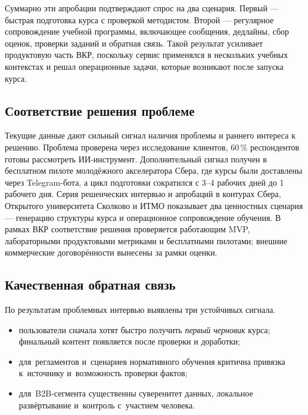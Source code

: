 Суммарно эти апробации подтверждают спрос на два сценария. Первый —
быстрая подготовка курса с проверкой методистом. Второй — регулярное
сопровождение учебной программы, включающее сообщения, дедлайны, сбор оценок,
проверки заданий и обратная связь. Такой результат усиливает продуктовую
часть ВКР, поскольку сервис применялся в нескольких учебных контекстах и решал
операционные задачи, которые возникают после запуска курса.

\subsection{Соответствие решения проблеме}

Текущие данные дают сильный сигнал наличия проблемы и раннего интереса
к решению. Проблема проверена через исследование клиентов, 60\,\%
респондентов готовы рассмотреть ИИ-инструмент. Дополнительный сигнал
получен в бесплатном пилоте молодёжного акселератора Сбера, где курсы были
доставлены через Telegram-бота, а цикл подготовки сократился с 3–4 рабочих
дней до 1 рабочего дня. Серия решенческих интервью и апробаций в контурах
Сбера, Открытого университета Сколково и ИТМО показывает два ценностных
сценария — генерацию структуры курса и операционное сопровождение обучения.
В рамках ВКР соответствие решения проверяется работающим MVP,
лабораторными продуктовыми метриками и бесплатными пилотами; внешние
коммерческие договорённости вынесены за рамки оценки.

\subsection{Качественная обратная связь}

По результатам проблемных интервью выявлены три устойчивых сигнала.
\begin{itemize}
  \item пользователи сначала хотят быстро получить \textit{первый черновик}
    курса; финальный контент появляется после проверки и доработки;
  \item для~регламентов и~сценариев нормативного обучения критична привязка к~источнику
    и~возможность проверки фактов;
  \item для~B2B-сегмента существенны суверенитет данных, локальное
    развёртывание и~контроль с~участием человека.
\end{itemize}
